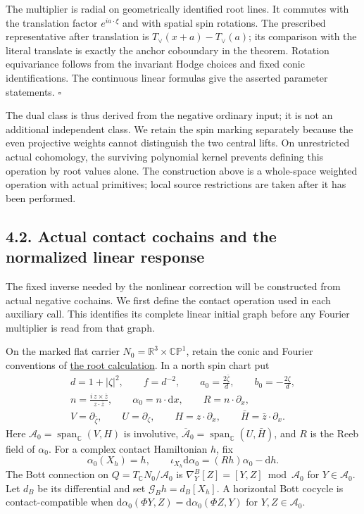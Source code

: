 \documentclass[
  english,
  11pt,
  reqno]{amsart}
\begin{document}
The multiplier is radial on geometrically identified root lines. It
commutes with the translation factor \(e^{ia\cdot\xi}\) and with spatial
spin rotations. The prescribed representative after translation is
\(T_\vee(x+a)-T_\vee(a)\); its comparison with the literal translate is
exactly the anchor coboundary in the theorem. Rotation equivariance
follows from the invariant Hodge choices and fixed conic
identifications. The continuous linear formulas give the asserted
parameter statements. \hfill\(\square\)

The dual class is thus derived from the negative ordinary input; it is
not an additional independent class. We retain the spin marking
separately because the even projective weights cannot distinguish the
two central lifts. On unrestricted actual cohomology, the surviving
polynomial kernel prevents defining this operation by root values alone.
The construction above is a whole-space weighted operation with actual
primitives; local source restrictions are taken after it has been
performed.

\subsection{4.2. Actual contact cochains and the normalized linear
response}\label{actual-contact-cochains-and-the-normalized-linear-response}\label{sec:online-actual-contact-response}

The fixed inverse needed by the nonlinear correction will be constructed
from actual negative cochains. We first define the contact operation
used in each auxiliary call. This identifies its complete linear initial
graph before any Fourier multiplier is read from that graph.

On the marked flat carrier \(N_0=\mathbb R^3\times\mathbb{CP}^1\),
retain the conic and Fourier conventions of
\hyperref[sec:online-root-complex]{the root calculation}. In a north
spin chart put%
 \[
\begin{gathered}
d=1+|\zeta|^2,\qquad f=d^{-2},\qquad
a_0=\frac{2\bar\zeta}{d},\qquad b_0=-\frac{2\zeta}{d},\\
n=\frac{i\,z\times\bar z}{z\cdot\bar z},\qquad
\alpha_0=n\cdot\mathrm dx,\qquad R=n\cdot\partial_x,\\
V=\partial_{\bar\zeta},\qquad U=\partial_\zeta,\qquad
H=z\cdot\partial_x,\qquad \bar H=\bar z\cdot\partial_x.
\end{gathered}
\] Here \(\mathcal A_0=\operatorname{span}_{\mathbb C}(V,H)\) is
involutive,
\(\overline{\mathcal A}_0=\operatorname{span}_{\mathbb C}(U,\bar H)\),
and \(R\) is the Reeb field of \(\alpha_0\). For a complex contact
Hamiltonian \(h\), fix \[
\alpha_0(X_h)=h,\qquad
\iota_{X_h}\mathrm d\alpha_0=(Rh)\alpha_0-\mathrm dh.
\] The Bott connection on \(Q=T_{\mathbb C}N_0/\mathcal A_0\) is
\(\nabla^B_Y[Z]=[Y,Z]\bmod \mathcal A_0\) for \(Y\in \mathcal A_0\). Let
\(d_B\) be its differential and set \(\mathcal G_Bh=d_B[X_h]\). A
horizontal Bott cocycle is contact-compatible when
\(\mathrm d\alpha_0(\Phi Y,Z)=\mathrm d\alpha_0(\Phi Z,Y)\) for
\(Y,Z\in \mathcal A_0\).
\end{document}
